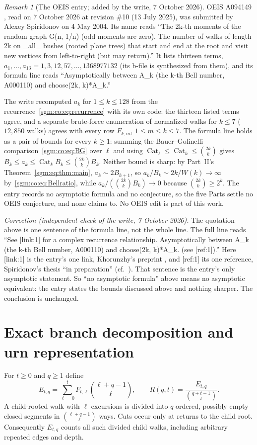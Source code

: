 \documentclass[11pt,letterpaper]{article}
\theoremstyle{remark}\newtheorem{remark}[theorem]{Remark}
\newcommand{\Cat}{\operatorname{Cat}}\newcommand{\E}{\mathbb E}\newcommand{\Prob}{\mathbb P}\newcommand{\ind}{\mathbf 1}
\theoremstyle{definition}\newtheorem{definition}[theorem]{Definition}
\begin{document}
\begin{remark}[The OEIS entry; added by the write, 7 October 2026]\label{sgm:co:rem:oeis}
OEIS A094149 \cite{oeis}, read on 7 October 2026 at revision \#10 (13 July 2025), was submitted by Alexey Spiridonov on 4 May 2004. Its name reads ``The 2k-th moments of the random graph G(n, 1/n) (odd moments are zero). The number of walks of length 2k on \_all\_ bushes (rooted plane trees) that start and end at the root and visit new vertices from left-to-right (but may return).'' It lists thirteen terms, $a_1,\ldots,a_{13}=1,3,12,57,\ldots,1368977132$ (its b-file is synthesized from them), and its formula line reads ``Asymptotically between A\_k (the k-th Bell number, A000110) and choose(2k, k)*A\_k.''

The write recomputed $a_k$ for $1\le k\le128$ from the recurrence~\eqref{sgm:co:eq:recurrence} with its own code: the thirteen listed terms agree, and a separate brute-force enumeration of normalized walks for $k\le7$ ($12{,}850$ walks) agrees with every row $F_{k,m}$, $1\le m\le k\le7$. The formula line holds as a pair of bounds for every $k\ge1$: summing the Bauer--Golinelli comparison~\eqref{sgm:co:eq:BG} over $\ell$ and using $\Cat_\ell\le\Cat_k\le\binom{2k}k$ gives $B_k\le a_k\le\Cat_kB_k\le\binom{2k}kB_k$. Neither bound is sharp: by Part~II's Theorem~\ref{sgm:eq:thm:main}, $a_k\sim2B_{k+1}$, so $a_k/B_k\sim2k/W(k)\to\infty$ by~\eqref{sgm:co:eq:Bellratio}, while $a_k/(\binom{2k}kB_k)\to0$ because $\binom{2k}k\ge2^k$. The entry records no asymptotic formula and no conjecture, so the five Parts settle no OEIS conjecture, and none claims to. No OEIS edit is part of this work.

\emph{Correction (independent check of the write, 7 October 2026).} The quotation above is one sentence of the formula line, not the whole line. The full line reads ``See [link:1] for a complex recurrence relationship. Asymptotically between A\_k (the k-th Bell number, A000110) and choose(2k, k)*A\_k. (see [ref:1]).'' Here [link:1] is the entry's one link, Khorunzhy's preprint \cite{kv}, and [ref:1] its one reference, Spiridonov's thesis ``in preparation'' (cf.\ \cite{spiridonov}). That sentence is the entry's only asymptotic statement. So ``no asymptotic formula'' above means no asymptotic equivalent: the entry states the bounds discussed above and nothing sharper. The conclusion is unchanged.
\end{remark}

\section{Exact branch decomposition and urn representation}\label{sgm:co:sec:branches}
For $t\ge0$ and $q\ge1$ define
\begin{equation}\label{sgm:co:eq:E}
 E_{t,q}=\sum_{\ell=0}^tF_{t,\ell}\binom{\ell+q-1}{\ell},\qquad
 R(q,t)=\frac{E_{t,q}}{\binom{q+t-1}{t}}.
\end{equation}
A child-rooted walk with $\ell$ excursions is divided into $q$ ordered, possibly empty closed segments in $\binom{\ell+q-1}{\ell}$ ways. Cuts occur only at returns to the child root. Consequently $E_{t,q}$ counts all such divided child walks, including arbitrary repeated edges and depth.
\end{document}
